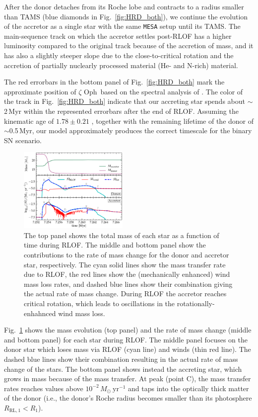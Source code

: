 \documentclass[twocolumn,twocolappendix,trackchanges]{aastex63}
\DeclareRobustCommand{\Figref}[1]{Fig.~\ref{#1}}
\newcommand{\zoph}{$\zeta$ Oph}
\begin{document}
After the donor detaches from its Roche lobe and contracts to a radius smaller than TAMS (blue diamonds in \Figref{fig:HRD_both}), we continue the evolution of the accretor as a single star with the same \texttt{MESA} setup until its TAMS. The main-sequence track on which the accretor settles post-RLOF has a higher luminosity compared to the original track because of the accretion of mass, and it has also a slightly steeper slope due to the close-to-critical rotation and the accretion of partially nuclearly processed material (He- and N-rich) material.

The red errorbars in the bottom panel of \Figref{fig:HRD_both} mark
the approximate position of \zoph\ based on the spectral analysis of
. The color of the track in
\Figref{fig:HRD_both} indicate that our accreting star spends about
$\sim$2\,Myr within the represented errorbars after the end of
RLOF. Assuming the kinematic age of $1.78\pm0.21$
\citep{neuhauser:20}, together with the remaining lifetime of the
donor of $\sim$0.5\,Myr, our model approximately produces the correct
timescale for the binary SN scenario.



\begin{figure}[htbp]
  \includegraphics[width=0.47\textwidth]{MT}
  \caption{The top panel shows the total mass of each star as a
    function of time during RLOF. The middle and bottom panel show the
    contributions to the rate of mass change for the donor and accretor star,
    respectively. The cyan solid lines show the mass transfer rate
    due to RLOF, the red lines show the (mechanically
    enhanced) wind mass loss rates, and dashed blue lines show their
    combination giving the actual rate of mass change. During RLOF the accretor reaches
    critical rotation, which leads to oscillations in the
    rotationally-enhahnced wind mass loss.}
  \label{fig:MT}
\end{figure}

\Figref{fig:MT} shows the mass evolution (top panel) and the rate of
mass change (middle and bottom panel) for each star during
RLOF. The middle panel focuses on the donor star which loses mass via RLOF
(cyan line) and winds (thin red line). The dashed blue lines
show their combination resulting in the actual rate of mass change of
the stars. The bottom panel shows instead the accreting star, which
grows in mass because of the mass transfer. At peak (point C), the mass transfer
rates reaches values above
$10^{-2}\,M_\odot\ \mathrm{yr^{-1}}$ and taps into the optically
thick matter of the donor (i.e., the donor's Roche radius becomes
smaller than its photosphere $R_\mathrm{RL,1}<R_1$).
\end{document}
